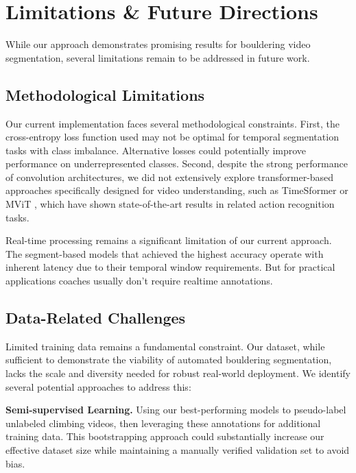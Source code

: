 \section{Limitations \& Future Directions}

While our approach demonstrates promising results for bouldering video segmentation, several limitations remain to be addressed in future work.

\subsection*{Methodological Limitations}
Our current implementation faces several methodological constraints. First, the cross-entropy loss function used may not be optimal for temporal segmentation tasks with class imbalance. Alternative losses could potentially improve performance on underrepresented classes. Second, despite the strong performance of convolution architectures, we did not extensively explore transformer-based approaches specifically designed for video understanding, such as TimeSformer \cite{time-s-former} or MViT \cite{mvit}, which have shown state-of-the-art results in related action recognition tasks.

Real-time processing remains a significant limitation of our current approach. The segment-based models that achieved the highest accuracy operate with inherent latency due to their temporal window requirements. But for practical applications coaches usually don't require realtime annotations.


\subsection*{Data-Related Challenges}
Limited training data remains a fundamental constraint. Our dataset, while sufficient to demonstrate the viability of automated bouldering segmentation, lacks the scale and diversity needed for robust real-world deployment. We identify several potential approaches to address this:

\noindent\textbf{Semi-supervised Learning.}
Using our best-performing models to pseudo-label unlabeled climbing videos, then leveraging these annotations for additional training data. This bootstrapping approach could substantially increase our effective dataset size while maintaining a manually verified validation set to avoid bias.

